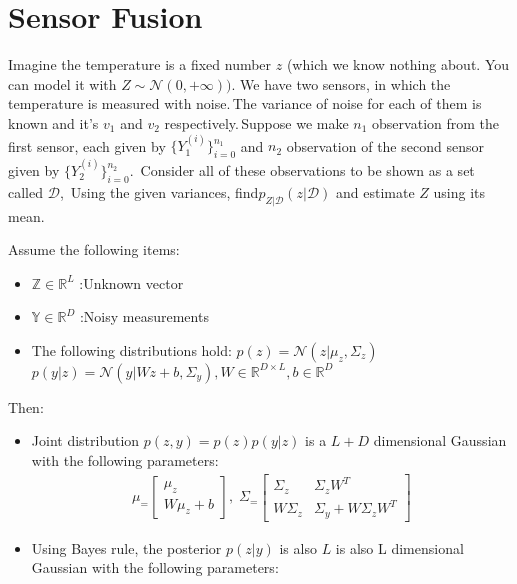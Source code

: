 \documentclass[12pt]{article}
\begin{document}
\section{Sensor Fusion}
Imagine the temperature is a fixed number $z$ (which we know nothing about. You can model it with $Z \sim \mathcal{N} (0, +\infty))$. We have two sensors, in which the temperature is measured with noise.\,The variance of noise for each of them is known and it’s $v_1$ and $v_2$ respectively.\,Suppose we make $n_1$ observation from the first sensor, each given by $\{Y_1^{(i)}\}_{i=0}^{n_1}$ and $n_2$ observation of the second sensor given by $\{Y_2^{(i)}\}_{i=0}^{n_2}$.\, Consider all of these observations to be shown as a set called $\mathcal{D}$,\, Using the given variances, find$p_{Z|\mathcal{D}}(z|\mathcal{D})$ and estimate $Z$ using its mean.
\begin{qsolve}[solution]
    Assume the following items:
    \begin{itemize}
        \item $\mathbb{Z} \in \mathbb{R}^{L}$ :Unknown vector
        \item $\mathbb{Y} \in \mathbb{R}^{D}$ :Noisy measurements
        \item The following distributions hold:
              \subitem              $p(z) = \mathcal{N}(z|\mu_z , \Sigma_z)$
              \subitem $p(y|z)=\mathcal{N}(y|Wz+b,\Sigma_y),W\in \mathbb{R}^{D\times L},b \in \mathbb{R}^D$
    \end{itemize}
    Then:
    \begin{itemize}
        \item Joint distribution $p(z,y) = p(z)p(y|z)$ is a $L+D$ dimensional Gaussian with the following parameters:
              \subitem \begin{align*}
                  \mu_ = \begin{bmatrix}
                      \mu_z \\
                      W\mu_z+b
                  \end{bmatrix}
                  , \; \Sigma_ = \begin{bmatrix}
                      \Sigma_z  & \Sigma_z W^T            \\
                      W\Sigma_z & \Sigma_y + W\Sigma_zW^T
                  \end{bmatrix}
              \end{align*}
        \item Using Bayes rule, the posterior $p(z|y)$ is also $L$ is also L dimensional Gaussian with the following parameters:

\end{itemize}
\end{qsolve}
\end{document}
